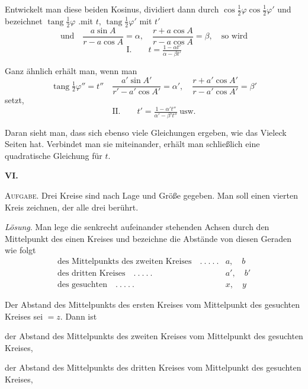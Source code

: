 %
\par
Entwickelt man diese beiden Kosinus, dividiert dann durch \(\cos\tfrac12\varphi\cos\tfrac12\varphi'\) und bezeichnet \(\operatorname{tang}\tfrac12\varphi\) .mit \(t\), \(\operatorname{tang}\tfrac12\varphi'\) mit \(t'\)
\[
\text{und}\quad\frac{a\sin A}{r-a\cos A}=\alpha,\quad\frac{r+a\cos A}{r-a\cos A}=\beta,\quad\text{so wird}
\]
\[
\text{I.}\qquad t=\tfrac{1-\alpha t'}{\alpha-\beta t'}
\]
\par
Ganz ähnlich erhält man, wenn man
\[
\operatorname{tang}\tfrac12\varphi''=t''\quad\frac{a'\sin A'}{r'-a'\cos A'}=\alpha',\quad\frac{r+a'\cos A'}{r-a'\cos A'}=\beta'
\]
setzt,
\[
\text{II.}\qquad t'=\tfrac{1-\alpha't''}{\alpha'-\beta't''}\ \text{usw.}
\]
\par
Daran sieht man, dass sich ebenso viele Gleichungen ergeben, wie das Vieleck Seiten hat. Verbindet man sie miteinander, erhält man schließlich eine quadratische Gleichung für \(t\).
\par\medskip{}
\centerline{\textbf{VI.}}\nobreak\smallskip
\textsc{Aufgabe}. Drei Kreise sind nach Lage und Größe gegeben. Man soll einen vierten Kreis zeichnen, der alle drei berührt.

\textit{Lösung}. Man lege die senkrecht aufeinander stehenden Achsen durch den Mittelpunkt des einen Kreises und bezeichne die Abstände von diesen Geraden wie folgt
\[
\begin{array}{rl}
\text{des Mittelpunkts des zweiten Kreises}\quad .\ .\ .\ .\ .&a,\quad b\\
\text{des dritten Kreises}\quad .\ .\ .\ .\ .&a',\quad b'\\
\text{des gesuchten}\quad .\ .\ .\ .\ .&x,\quad y
\end{array}
\]
\par
Der Abstand des Mittelpunkts des ersten Kreises vom Mittelpunkt des gesuchten Kreises sei \(=z\). Dann ist
\begin{list}{}{\setlength{\leftmargin}{3em}\setlength{\labelwidth}{2.5em}\setlength{\labelsep}{.5em}}
\item[\(z-c\)] der Abstand des Mittelpunkts des zweiten Kreises vom Mittelpunkt des gesuchten Kreises,
\item[\(z-c'\)] der Abstand des Mittelpunkts des dritten Kreises vom Mittelpunkt des gesuchten Kreises,
\end{list}
